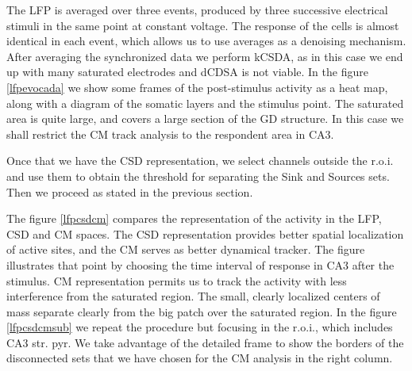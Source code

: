 \documentclass[12pt, letterpaper]{article}
\begin{document}



The LFP is averaged over three events, produced by three successive
electrical stimuli in the same point at constant voltage. The
response of the cells is almost identical in each event, which
allows us to use averages as a denoising mechanism. After averaging
the synchronized data we perform kCSDA, as in this case we end up
with many saturated electrodes and dCDSA is not viable.
In the figure \ref{lfpevocada} we show some frames of the post-stimulus
activity as a heat map, along
with a diagram of the somatic layers and the
stimulus point. The saturated area is quite large, and covers
a large section of the GD structure. In this case we shall
restrict the CM track analysis to the respondent area in CA3.

Once that we have the CSD representation, we select channels outside
the r.o.i. and use them to obtain the threshold for separating
the Sink and Sources sets. Then we proceed as stated in the previous section.

The figure \ref{lfpcsdcm}  compares the representation of the activity in
the LFP, CSD and CM spaces. The CSD
representation provides better spatial localization of active sites, and the
CM serves as better dynamical tracker. The figure illustrates
that point by choosing the time interval of response in CA3 after the stimulus.
CM representation permits us to track the activity with less
interference from the saturated region. The small, clearly localized centers of
mass separate clearly from the big patch over the saturated region.
In the figure \ref{lfpcsdcmsub} we repeat the procedure but focusing in
the r.o.i., which includes CA3 str. pyr. We take advantage of the
detailed frame to show the borders of the disconnected sets that
we have chosen for the CM analysis in the right column.
\end{document}
